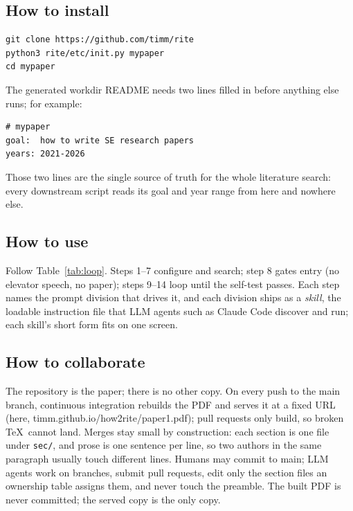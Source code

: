 \subsection{How to install}

\begin{verbatim}
git clone https://github.com/timm/rite
python3 rite/etc/init.py mypaper
cd mypaper
\end{verbatim}

The generated workdir README needs two lines filled in before anything
else runs; for example:

\begin{verbatim}
# mypaper
goal:  how to write SE research papers
years: 2021-2026
\end{verbatim}

Those two lines are the single source of truth for the whole
literature search: every downstream script reads its goal and year
range from here and nowhere else.

\subsection{How to use}

Follow Table~\ref{tab:loop}.
Steps 1--7 configure and search; step 8 gates entry (no elevator
speech, no paper); steps 9--14 loop until the self-test passes.
Each step names the prompt division that drives it, and each division
ships as a \textit{skill}, the loadable instruction file that LLM
agents such as Claude Code discover and run; each skill's short form
fits on one screen.

\subsection{How to collaborate}

The repository is the paper; there is no other copy.
On every push to the main branch, continuous integration rebuilds the
PDF and serves it at a fixed URL (here,
timm.github.io/how2rite/paper1.pdf); pull requests only build, so
broken \TeX\ cannot land.
Merges stay small by construction: each section is one file under
\texttt{sec/}, and prose is one sentence per line, so two authors in
the same paragraph usually touch different lines.
Humans may commit to main; LLM agents work on branches, submit pull
requests, edit only the section files an ownership table assigns them,
and never touch the preamble.
The built PDF is never committed; the served copy is the only copy.


